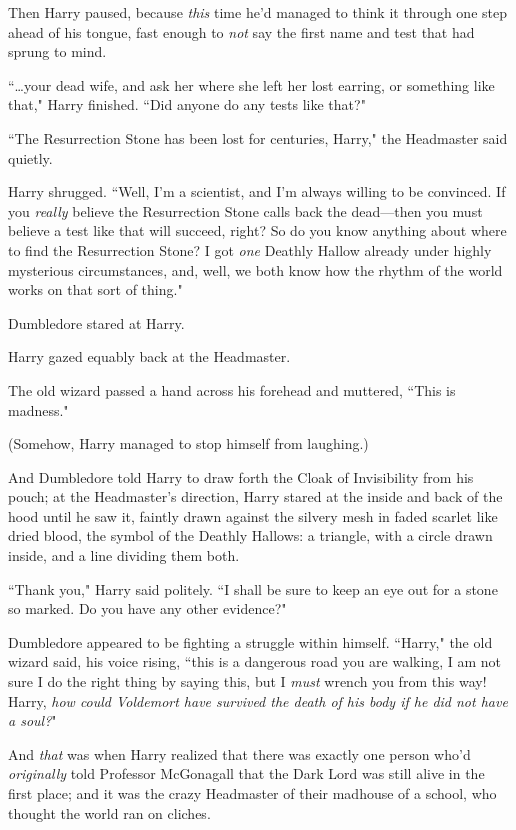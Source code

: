 Then Harry paused, because \emph{this} time he'd managed to think it through one step ahead of his tongue, fast enough to \emph{not} say the first name and test that had sprung to mind.

``{\ldots}your dead wife, and ask her where she left her lost earring, or something like that," Harry finished. ``Did anyone do any tests like that?"

``The Resurrection Stone has been lost for centuries, Harry," the Headmaster said quietly.

Harry shrugged. ``Well, I'm a scientist, and I'm always willing to be convinced. If you \emph{really} believe the Resurrection Stone calls back the dead—then you must believe a test like that will succeed, right? So do you know anything about where to find the Resurrection Stone? I got \emph{one} Deathly Hallow already under highly mysterious circumstances, and, well, we both know how the rhythm of the world works on that sort of thing."

Dumbledore stared at Harry.

Harry gazed equably back at the Headmaster.

The old wizard passed a hand across his forehead and muttered, ``This is madness."

(Somehow, Harry managed to stop himself from laughing.)

And Dumbledore told Harry to draw forth the Cloak of Invisibility from his pouch; at the Headmaster's direction, Harry stared at the inside and back of the hood until he saw it, faintly drawn against the silvery mesh in faded scarlet like dried blood, the symbol of the Deathly Hallows: a triangle, with a circle drawn inside, and a line dividing them both.

``Thank you," Harry said politely. ``I shall be sure to keep an eye out for a stone so marked. Do you have any other evidence?"

Dumbledore appeared to be fighting a struggle within himself. ``Harry," the old wizard said, his voice rising, ``this is a dangerous road you are walking, I am not sure I do the right thing by saying this, but I \emph{must} wrench you from this way! Harry, \emph{how could Voldemort have survived the death of his body if he did not have a soul?}"

And \emph{that} was when Harry realized that there was exactly one person who'd \emph{originally} told Professor McGonagall that the Dark Lord was still alive in the first place; and it was the crazy Headmaster of their madhouse of a school, who thought the world ran on cliches.


